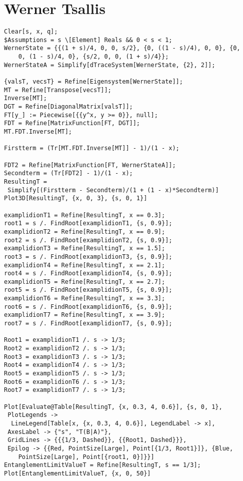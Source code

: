 \section{Werner Tsallis}
\begin{verbatim}
Clear[s, x, q];
$Assumptions = s \[Element] Reals && 0 < s < 1;
WernerState = {{(1 + s)/4, 0, 0, s/2}, {0, ((1 - s)/4), 0, 0}, {0, 
    0, (1 - s)/4, 0}, {s/2, 0, 0, (1 + s)/4}};
WernerStateA = Simplify[dTraceSystem[WernerState, {2}, 2]];

{valsT, vecsT} = Refine[Eigensystem[WernerState]];
MT = Refine[Transpose[vecsT]];
Inverse[MT];
DGT = Refine[DiagonalMatrix[valsT]];
FT[y_] := Piecewise[{{y^x, y >= 0}}, null];
FDT = Refine[MatrixFunction[FT, DGT]];
MT.FDT.Inverse[MT];

Firstterm = (Tr[MT.FDT.Inverse[MT]] - 1)/(1 - x);

FDT2 = Refine[MatrixFunction[FT, WernerStateA]];
Secondterm = (Tr[FDT2] - 1)/(1 - x);
ResultingT = 
 Simplify[(Firstterm - Secondterm)/(1 + (1 - x)*Secondterm)]
Plot3D[ResultingT, {x, 0, 3}, {s, 0, 1}]

examplidionT1 = Refine[ResultingT, x == 0.3];
root1 = s /. FindRoot[examplidionT1, {s, 0.9}];
examplidionT2 = Refine[ResultingT, x == 0.9];
root2 = s /. FindRoot[examplidionT2, {s, 0.9}];
examplidionT3 = Refine[ResultingT, x == 1.5];
root3 = s /. FindRoot[examplidionT3, {s, 0.9}];
examplidionT4 = Refine[ResultingT, x == 2.1];
root4 = s /. FindRoot[examplidionT4, {s, 0.9}];
examplidionT5 = Refine[ResultingT, x == 2.7];
root5 = s /. FindRoot[examplidionT5, {s, 0.9}];
examplidionT6 = Refine[ResultingT, x == 3.3];
root6 = s /. FindRoot[examplidionT6, {s, 0.9}];
examplidionT7 = Refine[ResultingT, x == 3.9];
root7 = s /. FindRoot[examplidionT7, {s, 0.9}];

Root1 = examplidionT1 /. s -> 1/3;
Root2 = examplidionT2 /. s -> 1/3;
Root3 = examplidionT3 /. s -> 1/3;
Root4 = examplidionT4 /. s -> 1/3;
Root5 = examplidionT5 /. s -> 1/3;
Root6 = examplidionT6 /. s -> 1/3;
Root7 = examplidionT7 /. s -> 1/3;

Plot[Evaluate@Table[ResultingT, {x, 0.3, 4, 0.6}], {s, 0, 1}, 
 PlotLegends -> 
  LineLegend[Table[x, {x, 0.3, 4, 0.6}], LegendLabel -> x], 
 AxesLabel -> {"s", "T(B|A)"}, 
 GridLines -> {{{1/3, Dashed}}, {{Root1, Dashed}}}, 
 Epilog -> {{Red, PointSize[Large], Point[{1/3, Root1}]}, {Blue, 
    PointSize[Large], Point[{root1, 0}]}}]
EntanglementLimitValueT = Refine[ResultingT, s == 1/3];
Plot[EntanglementLimitValueT, {x, 0, 50}]
\end{verbatim}
